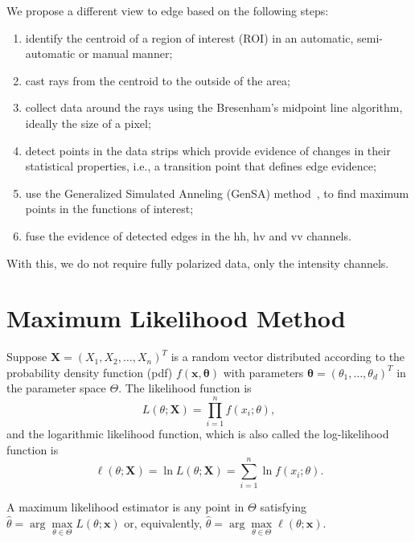 \documentclass[conference]{IEEEtran}
\begin{document}
We propose a different view to edge based on the following steps:
\begin{enumerate}
	\item identify the centroid of a region of interest (ROI) in an automatic, semi-automatic or manual manner;
	\item cast rays from the centroid to the outside of the area;
	\item collect data around the rays using the  Bresenham's midpoint line algorithm, ideally the size of a pixel;
	\item detect points in the data strips which provide evidence of changes in their statistical properties, i.e., a transition point that defines edge evidence;
	\item use the Generalized Simulated Anneling (GenSA) method~\cite{xgsh}, to find maximum points in the functions of interest;
	\item fuse the evidence of detected edges in the $\text{hh}$, $\text{hv}$ and $\text{vv}$ channels.
\end{enumerate}
With this, we do not require fully polarized data, only the intensity channels.

\section{Maximum Likelihood Method}\label{sec_05}

%
Suppose $\mathbf{X}=(X_1,X_2,\dots,X_n)^T$ is a random vector distributed according to the probability density function (pdf) $f(\mathbf{x},\mathbf{\theta})$ with parameters $\mathbf{\theta}=(\theta_1,\dots,\theta_d)^T$ in the parameter space $\Theta$.
The likelihood function is
\begin{equation*}
    L(\theta;\mathbf{X}) = \prod_{i=1}^{n}f(x_i;\theta),
\end{equation*}
and the logarithmic likelihood function, which is also called the log-likelihood function is
\begin{equation}
	\ell(\theta;\mathbf{X})= \ln L(\theta;\mathbf{X}) = \sum_{i=1}^{n}\ln f(x_i;\theta).
	\label{eq_09}
\end{equation}

A maximum likelihood estimator is any point in $\Theta$ satisfying $\widehat{\theta}= \arg\max\limits_{\theta\in\Theta}L(\theta;\mathbf{x})$ or, equivalently, $\widehat{\theta}= \arg\max\limits_{\theta\in\Theta}\ell(\theta;\mathbf{x})$.
\end{document}
